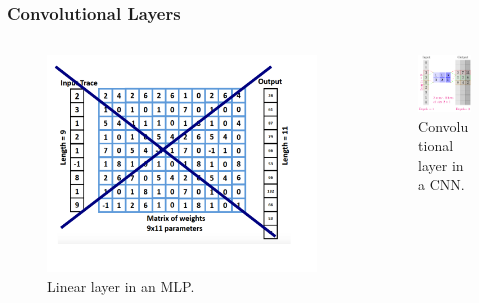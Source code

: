 \begin{frame}
\end{frame}

\begin{frame}
\frametitle{Convolutional Layers}
\begin{columns}
\begin{column}{0.5\textwidth}
\begin{figure}
\includegraphics[width=.45\textwidth]{figures/FC_no.png} 
\caption{Linear layer in an MLP.}
\end{figure}
\end{column}
\begin{column}{0.5\textwidth}
\begin{figure}
\includegraphics[width=.45\textwidth]{../tikz_per_manuscritto/conv_filter_2_1.pdf} 
\caption{Convolutional layer in a CNN.}
\end{figure}
\end{column}
\end{columns}
\end{frame}

